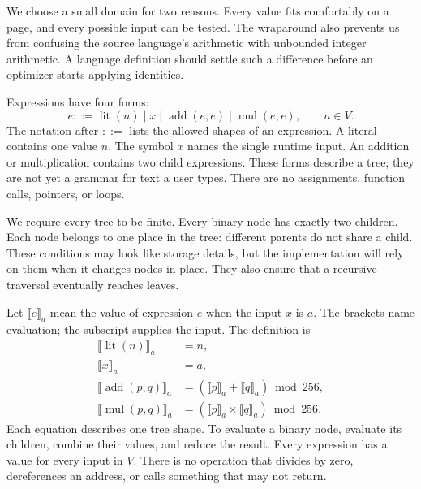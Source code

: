 We choose a small domain for two reasons.
Every value fits comfortably on a page, and every possible input can be tested.
The wraparound also prevents us from confusing the source language's arithmetic with unbounded integer arithmetic.
A language definition should settle such a difference before an optimizer starts applying identities.

Expressions have four forms:
\begin{equation}
  e ::= \operatorname{lit}(n)
      \mid x
      \mid \operatorname{add}(e,e)
      \mid \operatorname{mul}(e,e),
  \qquad n\in V.
  \label{eq:tiny-expression-grammar}
\end{equation}
The notation after $::=$ lists the allowed shapes of an expression.
A literal contains one value $n$.
The symbol $x$ names the single runtime input.
An addition or multiplication contains two child expressions.
These forms describe a tree; they are not yet a grammar for text a user types.
There are no assignments, function calls, pointers, or loops.

We require every tree to be finite.
Every binary node has exactly two children.
Each node belongs to one place in the tree: different parents do not share a child.
These conditions may look like storage details, but the implementation will rely on them when it changes nodes in place.
They also ensure that a recursive traversal eventually reaches leaves.

Let $\llbracket e\rrbracket_a$ mean the value of expression $e$ when the input $x$ is $a$.
The brackets name evaluation; the subscript supplies the input.
The definition is
\begin{align}
  \llbracket\operatorname{lit}(n)\rrbracket_a &= n, \label{eq:tiny-literal}\\
  \llbracket x\rrbracket_a &= a, \label{eq:tiny-input}\\
  \llbracket\operatorname{add}(p,q)\rrbracket_a
    &= (\llbracket p\rrbracket_a+\llbracket q\rrbracket_a)\bmod256,
       \label{eq:tiny-add}\\
  \llbracket\operatorname{mul}(p,q)\rrbracket_a
    &= (\llbracket p\rrbracket_a\times\llbracket q\rrbracket_a)\bmod256.
       \label{eq:tiny-mul}
\end{align}
Each equation describes one tree shape.
To evaluate a binary node, evaluate its children, combine their values, and reduce the result.
Every expression has a value for every input in $V$.
There is no operation that divides by zero, dereferences an address, or calls something that may not return.

